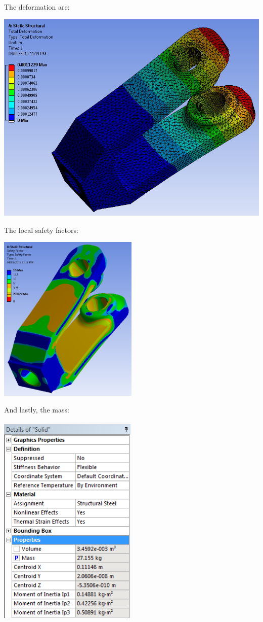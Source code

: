 \documentclass[a4paper,14pt]{extarticle}
\begin{document}
The deformation are:

\includegraphics[width=\textwidth]{NX/fin_deform.PNG}

The local safety factors:

\begin{center}\includegraphics[width=0.5\textwidth]{NX/fin_sf.PNG}\end{center}

And lastly, the mass:

\begin{center}\includegraphics[width=0.5\textwidth]{NX/fin_mass.PNG}\end{center}
\end{document}
